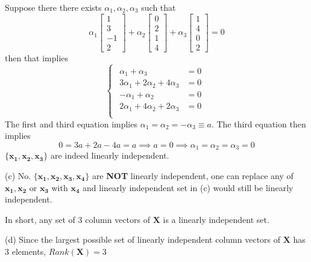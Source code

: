 \documentclass[a4paper, 12pt]{article}
\begin{document}
\begin{solution}
    Suppose there there exists $\alpha_1, \alpha_2, \alpha_3$ such that \[
        \alpha_1 \begin{bmatrix}
            1 \\ 3 \\ -1 \\ 2
        \end{bmatrix} + \alpha_2 \begin{bmatrix}
            0 \\ 2 \\ 1 \\ 4
        \end{bmatrix} + \alpha_3 \begin{bmatrix}
            1 \\ 4  \\ 0 \\ 2
        \end{bmatrix} = 0
    \]
    then that implies \[
    \begin{cases}
        \begin{aligned}
            \alpha_1 + \alpha_3 &= 0 \\
            3 \alpha_1 + 2 \alpha_2 + 4 \alpha_3 &= 0 \\
            - \alpha_1 + \alpha_2 &= 0 \\
            2 \alpha_1 + 4 \alpha_2 + 2\alpha_3 &= 0\\
        \end{aligned}
    \end{cases}
    \]
    The first and third equation implies $\alpha_1 = \alpha_2 = -\alpha_3 \equiv a$. The third equation then implies \[
    0 = 3a + 2a - 4a = a \implies a = 0 \implies \alpha_1 = \alpha_2 = \alpha_3 = 0
    \]
    $\{\mathbf{x_1, x_2, x_3}\}$ are indeed linearly independent.

    (c) No. $\{\mathbf{x_1, x_2, x_3, x_4}\}$ are \textbf{NOT} linearly independent, one can replace any of $\mathbf{x_1, x_2}$ or $\mathbf{x_3}$ with $\mathbf{x_4}$ and linearly independent set in (c) would still be linearly independent.

    In short, any set of 3 column vectors of $\mathbf{X}$ is a linearly independent set.

    (d) Since the largest possible set of linearly independent column vectors of $\mathbf{X}$ has 3 elements, $Rank(\mathbf{X}) = 3$
\end{solution}
\end{document}
